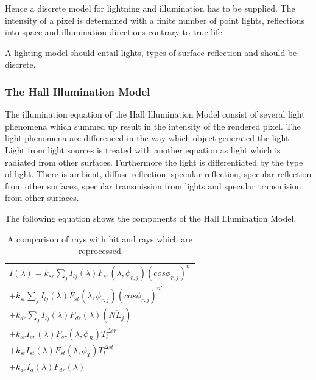 \documentclass[DIV10, abstracton, openright, footsepline, headsepline, twoside, 9pt,
bigheadings]{scrreprt}
\begin{document}
Hence a discrete model for lightning and illumination has to be supplied.
The intensity of a pixel is determined with a finite number of point
lights, reflections into space and illumination directions contrary to
true life.

A lighting model should entail lights, types of surface reflection
and should be discrete.


\subsubsection{The Hall Illumination Model}
\label{sec:hall_model}
\label{sec:analysis_hall_model}
The illumination equation of the Hall Illumination Model consist of
several light phenomena which summed up result in the intensity of
the rendered pixel. The light phenomena are differenced in the way
which object generated the light. Light from light sources is treated
with another equation as light which is radiated from other surfaces.
Furthermore the light is differentiated by the type of light. There is
ambient, diffuse reflection, specular reflection, specular reflection
from other surfaces, specular transmission from lights and  specular
transmision from other surfaces.

The following equation shows the components of the Hall Illumination
Model.


\begin{table}[h]
\centering
\begin{tabular}{l}
$I(\lambda) = k_{sr} \sum_j I_{lj}(\lambda) F_{sr} (\lambda, \phi_{r, j})
(cos \phi_{r,j})^n$\\
\hspace{1cm}$ + k_{st} \sum_j I_{lj}(\lambda)  F_{st} (\lambda, \phi_{r, j})
(cos \phi_{r,j})^{n'} $\\
\hspace{1cm}$ + k_{dr} \sum_j I_{lj}(\lambda)  F_{dr} (\lambda)(N \dot L_j)$\\
\hspace{1cm}$ + k_{sr}I_{sr}(\lambda)F_{sr}(\lambda, \phi_R)T_t^{\Delta sr}$\\
\hspace{1cm}$ + k_{st}I_{st}(\lambda)F_{st}(\lambda, \phi_T)T_t^{\Delta st}$\\
\hspace{1cm}$ + k_{dr}I_{a}(\lambda)F_{dr}(\lambda)$
\end{tabular}
\caption{A comparison of rays with hit and rays which are reprocessed}
\end{table}
\end{document}
